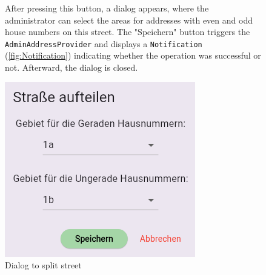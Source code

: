 \begin{figure}[H] 
    \begin{minipage}{0.6\textwidth}
        After pressing this button, a dialog appears, where the administrator can select the areas for addresses with even and odd house numbers on this street. The "Speichern" button triggers the \texttt{AdminAddressProvider} and displays a \texttt{Notification} (\ref{fig:Notification}) indicating whether the operation was successful or not. Afterward, the dialog is closed.
    \end{minipage}
    \hfill
    \begin{minipage}{0.35\textwidth}
        \centering
        \includegraphics[width=\linewidth]{images/AdminPanel/splitStreetDialog.png}
        \caption{Dialog to split street}
    \end{minipage}
\end{figure}



